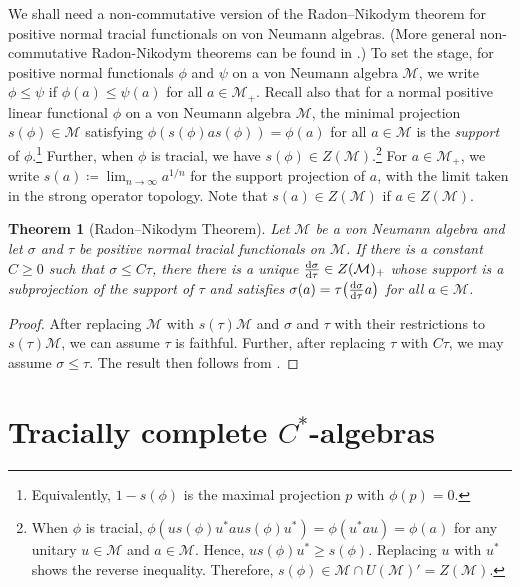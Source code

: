 \documentclass[a4paper,11pt]{amsart}
\newtheorem{theorem}{Theorem}
\theoremstyle{definition}
\numberwithin{equation}{section}
\numberwithin{theorem}{section}
\begin{document}
We shall need a non-commutative version of the Radon--Nikodym theorem for positive normal tracial functionals on von Neumann algebras. (More general non-commutative Radon-Nikodym theorems can be found in \cite{Dye52, Sakai65}.)  To set the stage, for positive normal functionals $\phi$ and $\psi$ on a von Neumann algebra $\mathcal M$, we write $\phi \leq \psi$ if $\phi(a) \leq \psi(a)$ for all $a \in \mathcal M_+$.  
Recall also that for a normal positive linear functional $\phi$ on a von Neumann algebra $\mathcal M$, the minimal projection $s(\phi) \in \mathcal M$ satisfying $\phi(s(\phi)as(\phi)) = \phi(a)$ for all $a \in \mathcal M$ is the \emph{support} of $\phi$.\footnote{Equivalently, $1-s(\phi)$ is the maximal projection $p$ with $\phi(p)=0.$}
Further, when $\phi$ is tracial, we have $s(\phi) \in Z(\mathcal M)$.\footnote{When $\phi$ is tracial, $\phi(u s(\phi) u^* a u s(\phi) u^*) = \phi(u^*au) = \phi(a)$
for any unitary $u \in \mathcal M$ and $a \in \mathcal M$. Hence, $u s(\phi)u^* \geq s(\phi)$. Replacing $u$ with $u^*$ shows the reverse inequality. Therefore, $s(\phi) \in \mathcal M \cap U(\mathcal M)' = Z(\mathcal M)$.}
For $a \in \mathcal M_+$, we write $s(a) \coloneqq \lim_{n \rightarrow \infty} a^{1/n}$ for the support projection of $a$, with the limit taken in the strong operator topology.  Note that $s(a) \in Z(\mathcal M)$ if $a \in Z(\mathcal M)$. 

\begin{theorem}[Radon--Nikodym Theorem]\label{thm:radon-nikodym}
    Let $\mathcal M$ be a von Neumann algebra and let $\sigma$ and $\tau$ be positive normal tracial functionals on $\mathcal M$.  If there is a constant  $C \geq 0$ such that $\sigma \leq C \tau$, there there is a unique $\frac{{\rm d} \sigma}{{\rm d} \tau} \in Z(\mathcal M)_+$ whose support is a subprojection of the support of $\tau$ and satisfies $\sigma(a) = \tau\big(\frac{{\rm d} \sigma}{{\rm d} \tau}a\big)$ for all $a \in \mathcal M$.
\end{theorem}

\begin{proof}
    After replacing $\mathcal M$ with $s(\tau)\mathcal M$ and $\sigma$ and $\tau$ with their restrictions to $s(\tau) \mathcal M$, we can assume $\tau$ is faithful.  Further, after replacing $\tau$ with $C\tau$, we may assume $\sigma \leq \tau$.  The result then follows from \cite[Theorem 3 in Part I, Chapter 6]{Di69EngTrans}. 
\end{proof}


\section{Tracially complete \texorpdfstring{$C^*$}{C*}-algebras}\label{sec:tracially-complete}
\end{document}
